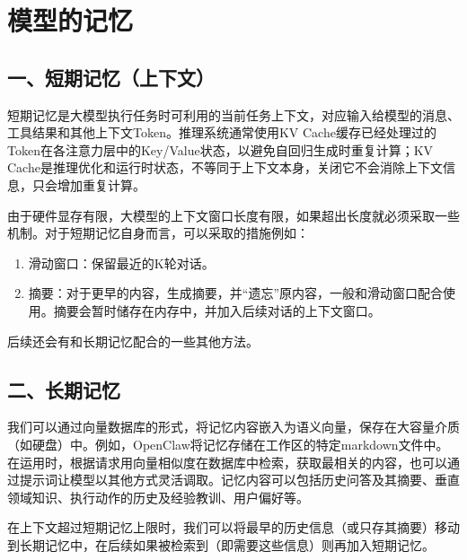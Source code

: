 \setcounter{section}{1}

\hypertarget{ux6a21ux578bux7684ux8bb0ux5fc6}{%
\section{模型的记忆}\label{ux6a21ux578bux7684ux8bb0ux5fc6}}

\hypertarget{ux4e00ux77edux671fux8bb0ux5fc6ux4e0aux4e0bux6587}{%
\subsection{一、短期记忆（上下文）}\label{ux4e00ux77edux671fux8bb0ux5fc6ux4e0aux4e0bux6587}}

短期记忆是大模型执行任务时可利用的当前任务上下文，对应输入给模型的消息、工具结果和其他上下文Token。推理系统通常使用KV Cache缓存已经处理过的Token在各注意力层中的Key/Value状态，以避免自回归生成时重复计算；KV Cache是推理优化和运行时状态，不等同于上下文本身，关闭它不会消除上下文信息，只会增加重复计算。

由于硬件显存有限，大模型的上下文窗口长度有限，如果超出长度就必须采取一些机制。对于短期记忆自身而言，可以采取的措施例如：

\begin{enumerate}
\def\labelenumi{\arabic{enumi}.}
\item
  滑动窗口：保留最近的K轮对话。
\item
  摘要：对于更早的内容，生成摘要，并``遗忘''原内容，一般和滑动窗口配合使用。摘要会暂时储存在内存中，并加入后续对话的上下文窗口。
\end{enumerate}

后续还会有和长期记忆配合的一些其他方法。

\hypertarget{ux4e8cux957fux671fux8bb0ux5fc6}{%
\subsection{二、长期记忆}\label{ux4e8cux957fux671fux8bb0ux5fc6}}

我们可以通过向量数据库的形式，将记忆内容嵌入为语义向量，保存在大容量介质（如硬盘）中。例如，OpenClaw将记忆存储在工作区的特定markdown文件中。在运用时，根据请求用向量相似度在数据库中检索，获取最相关的内容，也可以通过提示词让模型以其他方式灵活调取。记忆内容可以包括历史问答及其摘要、垂直领域知识、执行动作的历史及经验教训、用户偏好等。

在上下文超过短期记忆上限时，我们可以将最早的历史信息（或只存其摘要）移动到长期记忆中，在后续如果被检索到（即需要这些信息）则再加入短期记忆。

